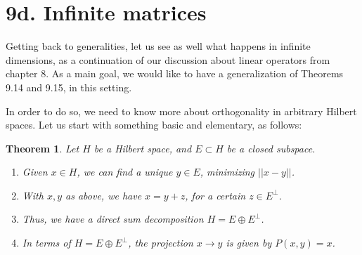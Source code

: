 \documentclass[12pt]{amsbook}
\newtheorem{theorem}{Theorem}[chapter]
\begin{document}
\section*{9d. Infinite matrices} 

Getting back to generalities, let us see as well what happens in infinite dimensions, as a continuation of our discussion about linear operators from chapter 8. As a main goal, we would like to have a generalization of Theorems 9.14 and 9.15, in this setting.

\bigskip

In order to do so, we need to know more about orthogonality in arbitrary Hilbert spaces. Let us start with something basic and elementary, as follows:

\begin{theorem}
Let $H$ be a Hilbert space, and $E\subset H$ be a closed subspace.
\begin{enumerate}
\item Given $x\in H$, we can find a unique $y\in E$, minimizing $||x-y||$.

\item With $x,y$ as above, we have $x=y+z$, for a certain $z\in E^\perp$.

\item Thus, we have a direct sum decomposition $H=E\oplus E^\perp$.

\item In terms of $H=E\oplus E^\perp$, the projection $x\to y$ is given by $P(x,y)=x$.
\end{enumerate}
\end{theorem}
\end{document}
